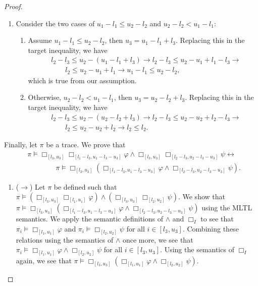 \documentclass{article}
\begin{document}
\begin{proof}
\begin{enumerate}
\begin{enumerate}
    \item 
        Consider the two cases of $u_1-l_1 \leq u_2-l_2$ and $u_2-l_2 < u_1-l_1$:
        \begin{enumerate}
            \item Assume $u_1-l_1 \leq u_2-l_2$, then $u_3 = u_1-l_1+l_3$. 
                Replacing this in the target inequality, we have 
                \begin{align*}
                    & l_2-l_3 \leq u_2-(u_1-l_1+l_3) \rightarrow l_2-l_3 \leq u_2-u_1+l_1-l_3 \rightarrow \\
                    & \qquad l_2 \leq u_2-u_1+l_1 \rightarrow u_1-l_1 \leq u_2-l_2,
                \end{align*}
                which is true from our assumption.
            \item Otherwise, $u_2-l_2 < u_1-l_1$, then $u_3 = u_2-l_2+l_3$.
                Replacing this in the target inequality, we have 
                \begin{align*}
                    & l_2-l_3 \leq u_2-(u_2-l_2+l_3) \rightarrow l_2-l_3 \leq u_2-u_2+l_2-l_3 \rightarrow \\
                    & \qquad l_2 \leq u_2-u_2+l_2 \rightarrow l_2 \leq l_2.
                \end{align*} 
            \end{enumerate}
    
    \end{enumerate}
Finally, let $\pi$ be a trace. We prove that
\begin{align*}
    &  \pi \models \Box_{[l_3,u_3]}{\Box_{[l_1-l_3,u_1-l_3-u_3]}{\varphi}} \land \Box_{[l_3,u_3]}{\Box_{[l_2-l_3,u_2-l_3-u_3]}{\psi}} \leftrightarrow \\ 
    & \qquad \qquad \pi \models \Box_{[l_3,u_3]}{(\Box_{[l_1-l_3,u_1-l_3-u_3]}{\varphi} \land \Box_{[l_2-l_3,u_2-l_3-u_3]}{\psi})}.
\end{align*} 
    \begin{enumerate}
    \item  ($\rightarrow$)
        Let $\pi$ be defined such that $\pi \models (\Box_{[l_3,u_3]}{\Box_{[l_1,u_1]}{\varphi}}) \land (\Box_{[l_3,u_3]}{\Box_{[l_2,u_2]}{\psi}})$.
        We show that $\pi \models \Box_{[l_3,u_3]}{(\Box_{[l_1-l_3,u_1-l_3-u_3]}{\varphi} \land \Box_{[l_2-l_3,u_2-l_3-u_3]}{\psi})}$ using the MLTL semantics.
        We apply the semantic definitions of $\land$ and $\Box_{I}{}$ to see that $\pi_i \models \Box_{[l_1,u_1]}{\varphi}$ and $\pi_i \models \Box_{[l_2,u_2]}{\psi}$ for all $i \in [l_3,u_3]$. 
        Combining these relations using the semantics of $\land$ once more, we see that $\pi_i \models \Box_{[l_1,u_1]}{\varphi} \land \Box_{[l_2,u_2]}{\psi}$ for all $i \in [l_3,u_3]$.
        Using the semantics of $\Box_{I}{}$ again, we see that $\pi \models \Box_{[l_3,u_3]}{(\Box_{[l_1,u_1]}{\varphi} \land \Box_{[l_2,u_2]}{\psi})}$.
    

\end{enumerate}
\end{enumerate}
\end{proof}
\end{document}
